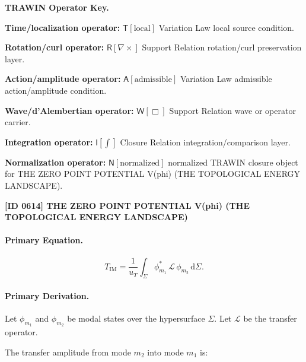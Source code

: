 \par\vspace{0.45\baselineskip}
\noindent\begin{minipage}[t]{\linewidth}
\begingroup
\small
\raggedright
\textbf{TRAWIN Operator Key.}\par
\noindent\textbf{Time/localization operator:} $\mathsf{T}\!\left[\mathrm{local}\right]$ Variation Law local source condition.\par
\noindent\textbf{Rotation/curl operator:} $\mathsf{R}\!\left[\nabla\times\right]$ Support Relation rotation/curl preservation layer.\par
\noindent\textbf{Action/amplitude operator:} $\mathsf{A}\!\left[\mathrm{admissible}\right]$ Variation Law admissible action/amplitude condition.\par
\noindent\textbf{Wave/d'Alembertian operator:} $\mathsf{W}\!\left[\Box\right]$ Support Relation wave or operator carrier.\par
\noindent\textbf{Integration operator:} $\mathsf{I}\!\left[\int\right]$ Closure Relation integration/comparison layer.\par
\noindent\textbf{Normalization operator:} $\mathsf{N}\!\left[\mathrm{normalized}\right]$ normalized TRAWIN closure object for THE ZERO POINT POTENTIAL V(phi) (THE TOPOLOGICAL ENERGY LANDSCAPE).\par
\endgroup
\end{minipage}

\clearpage
\noindent\textbf{[ID 0614] THE ZERO POINT POTENTIAL V(phi) (THE TOPOLOGICAL ENERGY LANDSCAPE)}\par
\vspace{0.35em}
\paragraph{Primary Equation.}
\begin{equation}
T_{\mathrm{IM}}
=
\frac{1}{u_T}
\int_{\Sigma}
\phi_{m_1}^{*}
\,\mathcal{L}\,
\phi_{m_2}
\,\mathrm{d}\Sigma .
\end{equation}

\paragraph{Primary Derivation.}
Let $\phi_{m_1}$ and $\phi_{m_2}$ be modal states over the hypersurface $\Sigma$.  
Let $\mathcal{L}$ be the transfer operator.

The transfer amplitude from mode $m_2$ into mode $m_1$ is:

